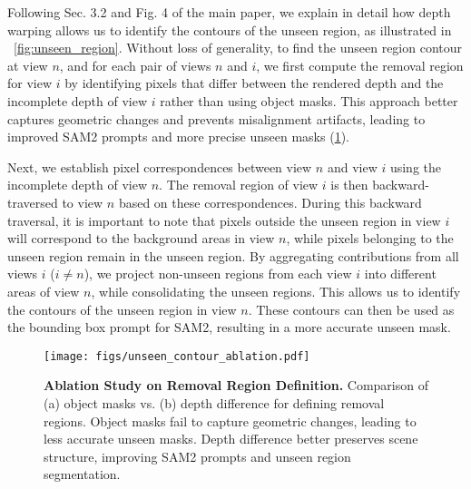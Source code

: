 Following Sec. \textcolor{cvprblue}{3.2} and Fig. \textcolor{cvprblue}{4} of the main paper, we explain in detail how depth warping allows us to identify the contours of the unseen region, as illustrated in ~\cref{fig:unseen_region}. Without loss of generality, to find the unseen region contour at view \(n\), and for each pair of views \(n\) and \(i\), we first compute the removal region for view \(i\) by identifying pixels that differ between the rendered depth and the incomplete depth of view \(i\) rather than using object masks. This approach better captures geometric changes and prevents misalignment artifacts, leading to improved SAM2\cite{ravi2024sam2} prompts and more precise unseen masks (\cref{fig:unseen_counter_ablation}). 

Next, we establish pixel correspondences between view \(n\) and view \(i\) using the incomplete depth of view \(n\). The removal region of view \(i\) is then backward-traversed to view \(n\) based on these correspondences. During this backward traversal, it is important to note that pixels outside the unseen region in view \(i\) will correspond to the background areas in view \(n\), while pixels belonging to the unseen region remain in the unseen region. By aggregating contributions from all views \(i\) (\(i \neq n\)), we project non-unseen regions from each view \(i\) into different areas of view \(n\), while consolidating the unseen regions. This allows us to identify the contours of the unseen region in view \(n\). These contours can then be used as the bounding box prompt for SAM2, resulting in a more accurate unseen mask. 





\begin{figure}[t]
    \centering
    \texttt{[image: figs/unseen\_contour\_ablation.pdf]}
    \caption{\textbf{Ablation Study on Removal Region Definition.} Comparison of (a) object masks vs. (b) depth difference for defining removal regions. Object masks fail to capture geometric changes, leading to less accurate unseen masks. Depth difference better preserves scene structure, improving SAM2 prompts and unseen region segmentation.}
    \label{fig:unseen_counter_ablation}
\end{figure}

